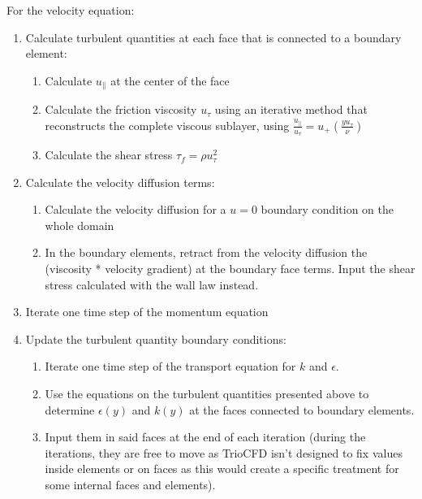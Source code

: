 For the velocity equation:
\begin{enumerate}
\item Calculate turbulent quantities at each face that is connected to a boundary element:
\begin{enumerate}
	\item Calculate $u_\parallel$ at the center of the face
	\item Calculate the friction viscosity $u_\tau$ using an iterative method that reconstructs the complete viscous sublayer, using $\frac{u_\parallel}{u_\tau} = u_+(\frac{y u_\tau}{\nu})$
	\item Calculate the shear stress $\tau_f = \rho u_\tau^2$
\end{enumerate}

\item Calculate the velocity diffusion terms:
\begin{enumerate}	
	\item Calculate the velocity diffusion for a $u=0$ boundary condition on the whole domain
	\item In the boundary elements, retract from the velocity diffusion the (viscosity * velocity gradient)  at the boundary face terms. Input the shear stress calculated with the wall law instead.
\end{enumerate}

\item Iterate one time step of the momentum equation

\item Update the turbulent quantity boundary conditions:
\begin{enumerate}
	\item Iterate one time step of the transport equation for $k$ and $\epsilon$.
	\item Use the equations on the turbulent quantities presented above to determine $\epsilon(y)$ and $k(y)$ at the faces connected to boundary elements.
	\item Input them in said faces at the end of each iteration (during the iterations, they are free to move as TrioCFD isn't designed to fix values inside elements or on faces as this would create a specific treatment for some internal faces and elements).
\end{enumerate}
\end{enumerate}

